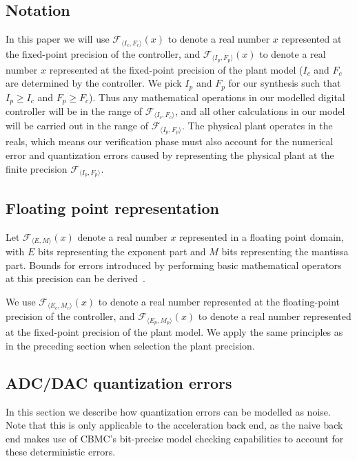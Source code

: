 \documentclass[twocolumn]{autart}    %
\begin{document}
\subsection{Notation}
In this paper we will use $\mathcal{F}_{\langle I_c,F_c \rangle}(x)$ to denote a real
number $x$ represented at the fixed-point precision of the controller, and
$\mathcal{F}_{\langle I_p,F_p \rangle}(x)$ to denote a real number $x$
represented at the fixed-point precision of the plant model ($I_c$ and $F_c$
are determined by the controller.  We pick $I_p$ and $F_p$ for our synthesis
such that $I_p \geq I_c$ and $\allowbreak F_p \geq F_c$).  Thus any
mathematical operations in our modelled digital controller will be in the
range of $\mathcal{F}_{\langle I_c,F_c \rangle}$, and all other calculations
in our model will be carried out in the range of $\mathcal{F}_{\langle
I_p,F_p \rangle}$.  The physical plant operates in the reals, which means
our verification phase must also account for the numerical error and
quantization errors caused by representing the physical plant at the finite
precision $\mathcal{F}_{\langle I_p,F_p \rangle}$.

\subsection{Floating point representation}

Let $\mathcal{F}_{\langle E,M \rangle}(x)$ denote a real number $x$
represented in a floating point domain, with $E$ bits representing the exponent
part and $M$ bits representing the mantissa part. Bounds for errors introduced by performing basic mathematical operators at this precision can be derived~\cite{DBLP:conf/arith/BrainTRW15}.

We use $\mathcal{F}_{\langle E_c,M_c \rangle}(x)$ to denote a real number represented at the floating-point precision of the controller, and $\mathcal{F}_{\langle E_p,M_p \rangle}(x)$ to denote a real number represented at the fixed-point precision of the plant model. We apply the same principles as in the preceding section when selection the plant precision.

\subsection{ADC/DAC quantization errors} 
In this section we describe how quantization errors can be modelled as noise. Note that this is only applicable to the acceleration back end, as the naive back end makes use of CBMC's bit-precise model checking capabilities to account for these deterministic errors.
\end{document}
